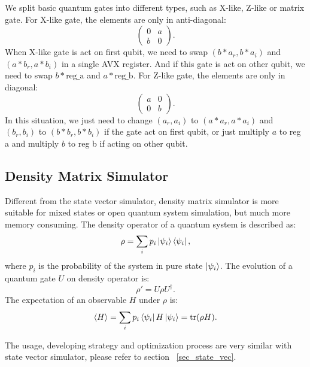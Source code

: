 We split basic quantum gates into different types, such as X-like, Z-like or matrix gate. For X-like gate, the elements are only in anti-diagonal:
\begin{equation}
    \begin{pmatrix}
        0 & a \\
        b & 0
    \end{pmatrix}.
\end{equation}
When X-like gate is act on first qubit, we need to swap $(b*a_r, b*a_i)$ and $(a*b_r, a*b_i)$ in a single AVX register. And if this gate is act on other qubit, we need to swap $b*\text{reg\_a}$ and $a*\text{reg\_b}$. For Z-like gate, the elements are only in diagonal:
\begin{equation}
    \begin{pmatrix}
        a & 0 \\
        0 & b
    \end{pmatrix}.
\end{equation}
In this situation, we just need to change $(a_r, a_i)$ to $(a*a_r, a*a_i)$ and $(b_r, b_i)$ to $(b*b_r, b*b_i)$ if the gate act on first qubit, or just multiply $a$ to reg a and multiply $b$ to reg b if acting on other qubit.

\subsection{Density Matrix Simulator}
Different from the state vector simulator, density matrix simulator is more suitable for mixed states or open quantum system simulation, but much more memory consuming. The density operator of a quantum system is described as:
\begin{equation}
    \rho=\sum_ip_i\ket{\psi_i}\bra{\psi_i},
\end{equation}
where $p_i$ is the probability of the system in pure state $\ket{\psi_i}$. The evolution of a quantum gate $U$ on density operator is:
\begin{equation}
    \rho'=U\rho U^\dagger.
\end{equation}
The expectation of an observable $H$ under $\rho$ is:
\begin{equation}
    \left<H\right> = \sum_ip_i\bra{\psi_i}H\ket{\psi_i}=\text{tr}(\rho H).
\end{equation}

The usage, developing strategy and optimization process are very similar with state vector simulator, please refer to section ~\ref{sec_state_vec}.
